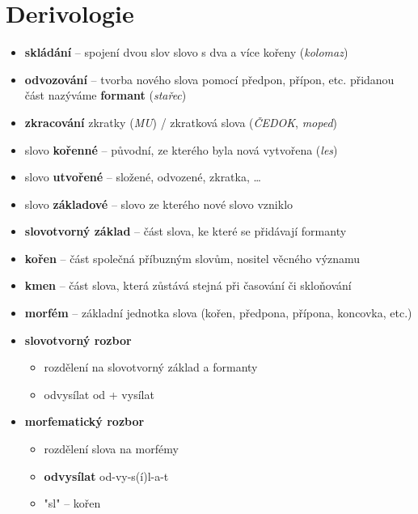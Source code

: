 \section{Derivologie}
\begin{itemize}
\item \textbf{skládání} -- spojení dvou slov \ra slovo s dva a více kořeny (\textit{kolomaz})
\item \textbf{odvozování} -- tvorba nového slova pomocí předpon, přípon, etc. přidanou část nazýváme \textbf{formant} (\textit{stařec})
\item \textbf{zkracování} \ra zkratky (\textit{MU}) / zkratková slova  (\textit{ČEDOK}, \textit{moped})
\item slovo \textbf{kořenné} -- původní, ze kterého byla nová vytvořena (\textit{les})
\item slovo \textbf{utvořené} -- složené, odvozené, zkratka, \ldots
\item slovo \textbf{základové} -- slovo ze kterého nové slovo vzniklo
\item \textbf{slovotvorný základ} -- část slova, ke které se přidávají formanty
\item \textbf{kořen} -- část společná příbuzným slovům, nositel věcného významu
\item \textbf{kmen} -- část slova, která zůstává stejná při časování či skloňování
\item \textbf{morfém} -- základní jednotka slova (kořen, předpona, přípona, koncovka, etc.)
\item \textbf{slovotvorný rozbor} 
	\begin{itemize}
	\item rozdělení na slovotvorný základ a formanty
	\item odvysílat \ra od + vysílat
	\end{itemize}
\item \textbf{morfematický rozbor}
	\begin{itemize}
		\item rozdělení slova na morfémy
		\item \textbf{odvysílat} \ra od-vy-s(í)l-a-t
		\item "sl" -- kořen
	\end{itemize}
\end{itemize}

